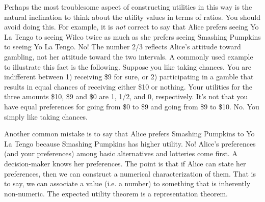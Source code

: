 Perhaps the most troublesome aspect of constructing utilities in this
way is the natural inclination to think about the utility values in
terms of ratios. You should avoid doing this.  For example, it is
\emph{not} correct to say that Alice prefers seeing Yo La Tengo to
seeing Wilco twice as much as she prefers seeing Smashing Pumpkins to
seeing Yo La Tengo. No! The number 2/3 reflects Alice's attitude
toward gambling, not her attitude toward the two intervals. A commonly
used example~\cite{luce:1957} to illustrate this fact is the
following. Suppose you like taking chances. You are
indifferent between 1) receiving \$9 for sure, or 2) participating in
a gamble that results in equal chances of receiving either \$10 or
nothing. Your utilities for the three amounts \$10, \$9 and \$0 are 1,
1/2, and 0, respectively. It's not that you have equal preferences
for going from \$0 to \$9 and going from \$9 to \$10. No. You simply
like taking chances.

Another common mistake is to say that Alice prefers Smashing Pumpkins
to Yo La Tengo because Smashing Pumpkins has higher utility. No!
Alice's preferences (and your preferences) among basic alternatives
and lotteries come first. A decision-maker knows her preferences. The
point is that if Alice can state her preferences, then we can
construct a numerical characterization of them. That is to say, we can
associate a value (i.e. a number) to something that is inherently
non-numeric.  The expected utility theorem is a representation
theorem.

